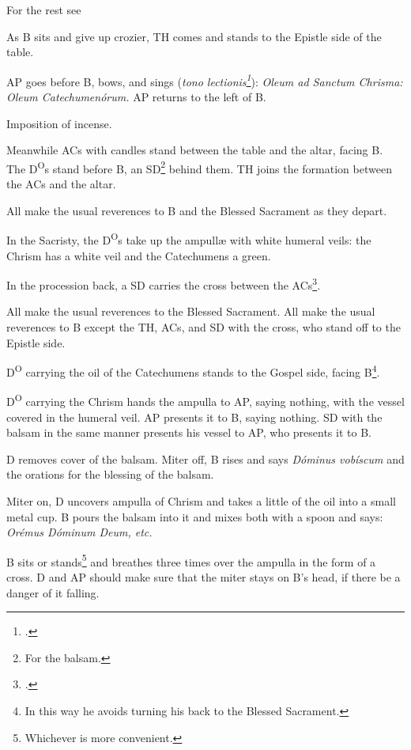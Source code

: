 {\rubric For the rest see 

\rubric As B sits and give up crozier, TH comes and stands to the Epistle side
of the table.

\rubric AP goes before B, bows, and sings (\textit{tono lectionis\footcite[p.
186]{stehle}}): \textit{Oleum ad Sanctum Chrisma: Oleum Catechumenórum.} AP
returns to the left of B.

\rubric Imposition of incense.

\rubric Meanwhile ACs with candles stand between the table and the altar,
facing B. The D\textsuperscript{O}s stand before B, an SD\footnote{For the
balsam.} behind them. TH joins the formation between the ACs and the altar.

\rubric All make the usual reverences to B and the Blessed Sacrament as they
depart.

\rubric In the Sacristy, the D\textsuperscript{O}s take up the ampullæ with
white humeral veils: the Chrism has a white veil and the Catechumens a green.

\rubric In the procession back, a SD carries the cross between the
ACs\footcite[p. 187]{stehle}.

\rubric All make the usual reverences to the Blessed Sacrament. All make the
usual reverences to B except the TH, ACs, and SD with the cross, who stand off
to the Epistle side.

\rubric D\textsuperscript{O} carrying the oil of the Catechumens stands to the
Gospel side, facing B\footnote{In this way he avoids turning his back to the
Blessed Sacrament.}.

\rubric D\textsuperscript{O} carrying the Chrism hands the ampulla to AP,
saying nothing, with the vessel covered in the humeral veil. AP presents it to
B, saying nothing. SD with the balsam in the same manner presents his vessel to
AP, who presents it to B.

\rubric D removes cover of the balsam. Miter off, B rises and says
\textit{Dóminus vobíscum} and the orations for the blessing of the balsam.

\rubric Miter on, D uncovers ampulla of Chrism and takes a little of the oil
into a small metal cup. B pours the balsam into it and mixes both with a spoon
and says: \textit{Orémus Dóminum Deum, etc.}

\rubric B sits or stands\footnote{Whichever is more convenient.} and breathes
three times over the ampulla in the form of a cross. D and AP should make sure
that the miter stays on B's head, if there be a danger of it falling.

}
